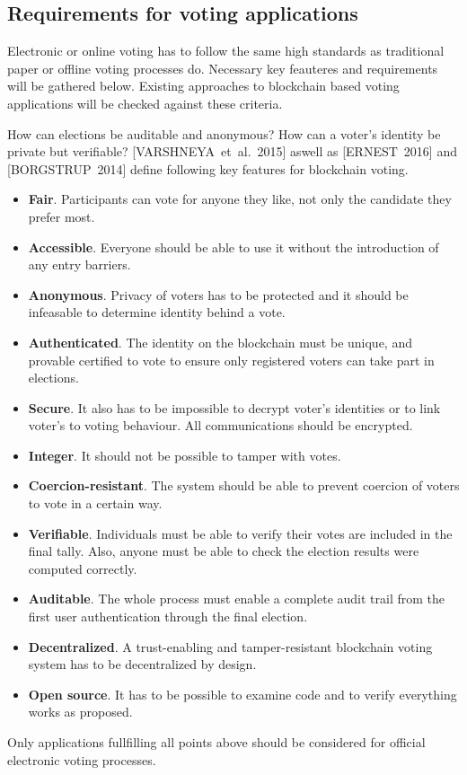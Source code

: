 \documentclass[9pt,oneside]{amsart}
\begin{document}
\begin{multicols}{2}
\subsection{Requirements for voting applications}
\label{sec:req}
Electronic or online voting has to follow the same high standards as traditional paper or offline voting processes do. Necessary key feauteres and requirements will be gathered below. Existing approaches to blockchain based voting applications will be checked against these criteria.\par
How can elections be auditable and anonymous? How can a voter's identity be private but verifiable? [VARSHNEYA~et~al.~2015] aswell as [ERNEST~2016] and [BORGSTRUP~2014] define following key features for blockchain voting.
\begin{itemize}
\item \textbf{Fair}. Participants can vote for anyone they like, not only the candidate they prefer most.
\item \textbf{Accessible}. Everyone should be able to use it without the introduction of any entry barriers.
\item \textbf{Anonymous}. Privacy of voters has to be protected and it should be infeasable to determine identity behind a vote. %
\item \textbf{Authenticated}. The identity on the blockchain must be unique, and provable certified to vote to ensure only registered voters can take part in elections.
\item \textbf{Secure}. It also has to be impossible to decrypt voter's identities or to link voter's to voting behaviour. All communications should be encrypted.
\item \textbf{Integer}. It should not be possible to tamper with votes.
\item \textbf{Coercion-resistant}. The system should be able to prevent coercion of voters to vote in a certain way.
\item \textbf{Verifiable}. Individuals must be able to verify their votes are included in the final tally. Also, anyone must be able to check the election results were computed correctly.
\item \textbf{Auditable}. The whole process must enable a complete audit trail from the first user authentication through the final election.
\item \textbf{Decentralized}. A trust-enabling and tamper-resistant blockchain voting system has to be decentralized by design.
\item \textbf{Open source}. It has to be possible to examine code and to verify everything works as proposed.
\end{itemize}
Only applications fullfilling all points above should be considered for official electronic voting processes. %


\end{multicols}
\end{document}
